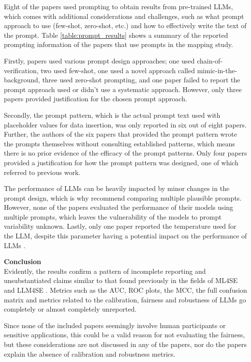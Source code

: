 \documentclass[a4paper]{article}
\begin{document}
Eight of the papers used prompting to obtain results from pre-trained LLMs, which comes with additional considerations and challenges, such as what prompt approach to use (few-shot, zero-shot, etc.) and how to effectively write the text of the prompt. Table \ref{table:prompt_results} shows a summary of the reported prompting information of the papers that use prompts in the mapping study. 

Firstly, papers used various prompt design approaches; one used chain-of-verification, two used few-shot, one used a novel approach called mimic-in-the-background, three used zero-shot prompting, and one paper failed to report the prompt approach used or didn't use a systematic approach. However, only three papers provided justification for the chosen prompt approach. 

Secondly, the prompt pattern, which is the actual prompt text used with placeholder values for data insertion, was only reported in six out of eight papers. Further, the authors of the six papers that provided the prompt pattern wrote the prompts themselves without consulting established patterns, which means there is no prior evidence of the efficacy of the prompt patterns. Only four papers provided a justification for how the prompt pattern was designed, one of which referred to previous work.

The performance of LLMs can be heavily impacted by minor changes in the prompt design, which is why \textcite{sclar2024quantifyinglanguagemodelssensitivity} recommend comparing multiple plausible prompts. However, none of the papers evaluated the performance of their models using multiple prompts, which leaves the vulnerability of the models to prompt variability unknown. Lastly, only one paper reported the temperature used for the LLM, despite this parameter having a potential impact on the performance of LLMs \cite{peeperkorn2024}.

\textbf{Conclusion}\\
Evidently, the results confirm a pattern of incomplete reporting and unsubstantiated claims similar to that found previously in the fields of ML4SE \cite{Dellanna2022} and LLM4SE \cite{hou2024}. Metrics such as the AUC, ROC plots, the MCC, the full confusion matrix and metrics related to the calibration, fairness and robustness of LLMs go completely or almost completely unreported.

Since none of the included papers seemingly involve human participants or sensitive applications, this could be a valid reason for not evaluating the fairness, but these considerations are not discussed in any of the papers, nor do the papers explain the absence of calibration and robustness metrics. 
\end{document}
